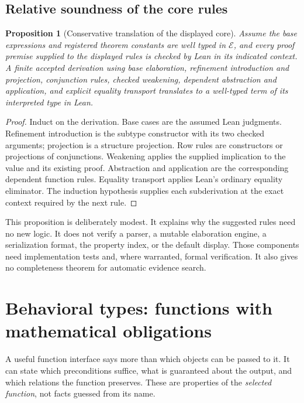 \documentclass[11pt,a4paper]{article}
\theoremstyle{plain}
\newtheorem{proposition}{Proposition}[section]
\theoremstyle{definition}
\theoremstyle{remark}
\begin{document}
\subsection{Relative soundness of the core rules}
\begin{proposition}[Conservative translation of the displayed core]
Assume the base expressions and registered theorem constants are well typed in
$\mathcal E$, and every proof premise supplied to the displayed rules is checked
by Lean in its indicated context. A finite accepted derivation using base
elaboration, refinement introduction and projection, conjunction rules,
checked weakening, dependent abstraction and application, and explicit equality
transport translates to a well-typed term of its interpreted type in Lean.
\end{proposition}
\begin{proof}
Induct on the derivation. Base cases are the assumed Lean judgments.
Refinement introduction is the subtype constructor with its two checked
arguments; projection is a structure projection. Row rules are constructors
or projections of conjunctions. Weakening applies the supplied implication to
the value and its existing proof. Abstraction and application are the
corresponding dependent function rules. Equality transport applies Lean's
ordinary equality eliminator. The induction hypothesis supplies each
subderivation at the exact context required by the next rule.
\end{proof}

This proposition is deliberately modest. It explains why the suggested rules
need no new logic. It does not verify a parser, a mutable elaboration engine,
a serialization format, the property index, or the default display. Those
components need implementation tests and, where warranted, formal verification.
It also gives no completeness theorem for automatic evidence search.

\section{Behavioral types: functions with mathematical obligations}
\label{sec:behavior}
A useful function interface says more than which objects can be passed to it.
It can state which preconditions suffice, what is guaranteed about the output,
and which relations the function preserves. These are properties of the
\emph{selected function}, not facts guessed from its name.
\end{document}
